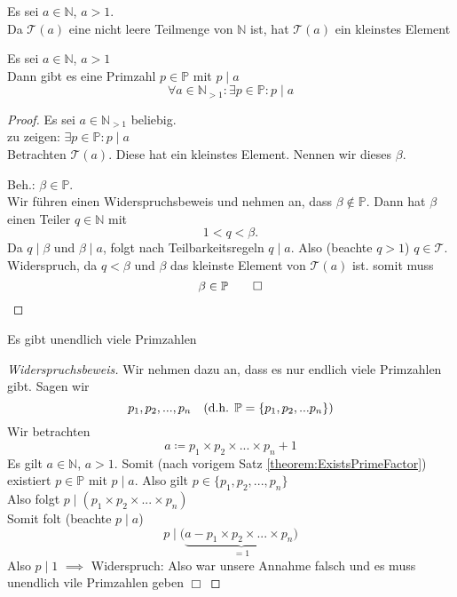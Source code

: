 \documentclass[a4paper, parskip = true, fleqn, headsepline = true]{scrartcl}
\DeclareRobustCommand{\qed}{%
	\ifmmode \tag*{$\Box$}%
	\else \leavevmode\unskip\penalty9999 \hbox{}\nobreak\hfill\quad\hbox{$\Box$}%
	\fi%
}
\newcommand{\N}{\mathbb{N}}
\begin{document}
\begin{corollary}
	Es sei $ a \in \N $, $ a > 1 $.\\
	Da $ \mathcal{T}(a) $ eine nicht leere Teilmenge von $ \N $ ist, hat $ \mathcal{T}(a) $ ein kleinstes Element
\end{corollary}

\begin{theorem}
	\label{theorem:ExistsPrimeFactor}
	Es sei $ a \in \N $, $ a > 1 $\\
	Dann gibt es eine Primzahl $ p \in \mathbb{P} $ mit $ p \mid a $
	\[ \forall a \in \N_{>1} : \exists p \in \mathbb{P} : p \mid a \]
	\begin{proof}
		Es sei $ a \in \N_{>1} $ beliebig.\\
		zu zeigen: $ \exists p \in \mathbb{P} : p \mid a $\\
		Betrachten $ \mathcal{T}(a) $. Diese hat ein kleinstes Element. Nennen wir dieses $ \beta $.\par
		Beh.: $ \beta \in \mathbb{P} $.\\
		Wir führen einen Widerspruchsbeweis und nehmen an, dass $ \beta \notin \mathbb{P} $. Dann hat $ \beta $ einen Teiler $ q \in \N $ mit
		\[ 1 < q < \beta. \]
		Da $ q \mid \beta $  und $ \beta \mid a $, folgt nach Teilbarkeitsregeln $ q \mid a $. Also (beachte $ q > 1 $) $ q \in \mathcal{T} $.\\
		Widerspruch, da $ q < \beta $ und $ \beta $ das kleinste Element von $ \mathcal{T}(a) $ ist.
		somit muss
		\[ \beta \in \mathbb{P} \qed \]
	\end{proof}
\end{theorem}

\begin{theorem}[(Euklid)]
	Es gibt unendlich viele Primzahlen
	\begin{proof}[Widerspruchsbeweis]
		Wir nehmen dazu an, dass es nur endlich viele Primzahlen gibt. Sagen wir
		\[ p_1, p_2, ..., p_n \quad \text{(d.h. $ \mathbb{P} = \{ p_1, p_2, ... p_n \} $)} \]
		Wir betrachten
		\[ a \coloneqq p_1 \times p_2 \times ... \times p_n + 1 \]
		Es gilt $ a \in \N $, $ a > 1 $. Somit (nach vorigem Satz \ref{theorem:ExistsPrimeFactor}) existiert $ p \in \mathbb{P} $ mit $ p \mid a $. Also gilt $ p \in \{ p_1, p_2, ..., p_n \} $\\
		Also folgt $ p \mid ( p_1 \times p_2 \times ... \times p_n ) $\\
		Somit folt (beachte $ p \mid a $)
		\[ p \mid ( \underbrace{ a - p_1 \times p_2 \times ... \times p_n ) }_{=1} \]
		Also $ p \mid 1 $ $ \implies $ Widerspruch: Also war unsere Annahme falsch und es muss unendlich vile Primzahlen geben \qed
	\end{proof}
\end{theorem}
\end{document}
